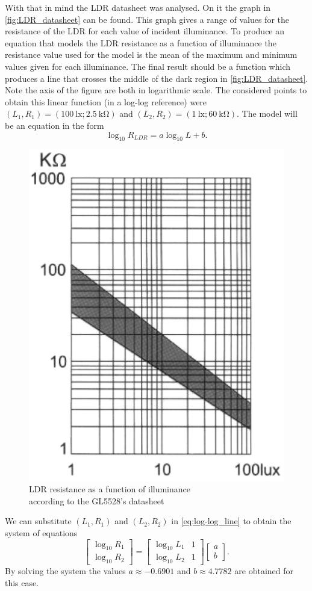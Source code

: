 With that in mind the LDR datasheet was analysed. On it the graph in \autoref{fig:LDR_datasheet} can be found. This graph gives a range of values for the resistance of the LDR for each value of incident illuminance. To produce an equation that models the LDR resistance as a function of illuminance the resistance value used for the model is the mean of the maximum and minimum values given for each illuminance. The final result should be a function which produces a line that crosses the middle of the dark region in \autoref{fig:LDR_datasheet}. Note the axis of the figure are both in logarithmic scale. The considered points to obtain this linear function (in a log-log reference) were $(L_1, R_1) = (\SI{100}{\lux}; \SI{2.5}{\kilo\ohm})$ and $(L_2, R_2) = (\SI{1}{\lux}; \SI{60}{\kilo\ohm})$. The model will be an equation in the form
\begin{equation} \label{eq:log-log_line}
    \log_{10} R_{LDR} = a \log_{10} L + b.
\end{equation}

\begin{figure}[h]
    \centering
    \includegraphics[width=.4\textwidth]{img/LDR_datasheet}
    \caption{LDR resistance as a function of illuminance \\ according to the GL5528's datasheet}
    \label{fig:LDR_datasheet}
\end{figure}

We can substitute $(L_1, R_1)$ and $(L_2, R_2)$ in \eqref{eq:log-log_line} to obtain the system of equations
\begin{equation} \label{eq:log-log_line_system}
    \begin{bmatrix}
	\log_{10}R_1 \\ \log_{10}R_2
    \end{bmatrix}
    =
    \begin{bmatrix}
	\log_{10}L_1  &  1 \\
	\log_{10}L_2  &  1
    \end{bmatrix}
    \begin{bmatrix}
	a \\ b
    \end{bmatrix}.
\end{equation}
By solving the system the values $a \approx -0.6901$ and $b \approx 4.7782$ are obtained for this case.

